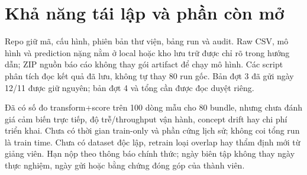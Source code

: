 \section{Khả năng tái lập và phần còn mở}
Repo giữ mã, cấu hình, phiên bản thư viện, bảng run và audit. Raw CSV, mô hình và prediction nặng nằm ở local hoặc kho lưu trữ được chỉ rõ trong hướng dẫn; ZIP nguồn báo cáo không thay gói artifact để chạy mô hình. Các script phân tích đọc kết quả đã lưu, không tự thay 80 run gốc. Bản đợt 3 đã gửi ngày 12/11 được giữ nguyên; bản đợt 4 và tổng cần được đọc duyệt riêng.

Đã có số đo transform+score trên 100 dòng mẫu cho 80 bundle, nhưng chưa đánh giá cảm biến trực tiếp, độ trễ/throughput vận hành, concept drift hay chi phí triển khai. Chưa có thời gian train-only và phần cứng lịch sử; không coi tổng run là train time. Chưa có dataset độc lập, retrain loại overlap hay thẩm định mới từ giảng viên. Hạn nộp theo thông báo chính thức; ngày biên tập không thay ngày thực nghiệm, ngày gửi hoặc bằng chứng đóng góp của thành viên.
